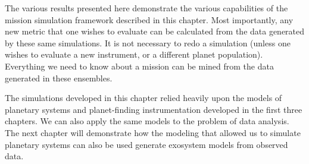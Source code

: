 \bigskip
\bigskip

The various results presented here demonstrate the various capabilities of the mission simulation framework described in this chapter.  Most importantly, any new metric that one wishes to evaluate can be calculated from the data generated by these same simulations.  It is not necessary to redo a simulation (unless one wishes to evaluate a new instrument, or a different planet population).  Everything we need to know about a mission can be mined from the data generated in these ensembles.

The simulations developed in this chapter relied heavily upon the models of planetary systems and planet-finding instrumentation developed in the first three chapters.  We can also apply the same models to the problem of data analysis.  The next chapter will demonstrate how the modeling that allowed us to simulate planetary systems can also be used generate exosystem models from observed data.